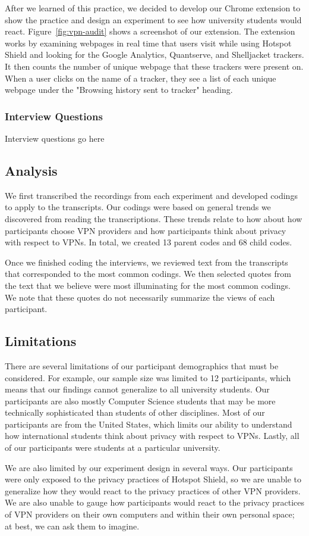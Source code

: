 After we learned of this practice, we decided to develop our Chrome extension to show the practice and design an experiment to see how university students would react.
Figure~\ref{fig:vpn-audit} shows a screenshot of our extension.
The extension works by examining webpages in real time that users visit while using Hotspot Shield and looking for the Google Analytics, Quantserve, and Shelljacket trackers.
It then counts the number of unique webpage that these trackers were present on.
When a user clicks on the name of a tracker, they see a list of each unique webpage under the "Browsing history sent to tracker" heading.

\subsubsection{Interview Questions}
Interview questions go here

\subsection{Analysis}
We first transcribed the recordings from each experiment and developed codings to apply to the transcripts.
Our codings were based on general trends we discovered from reading the transcriptions.
These trends relate to how about how participants choose VPN providers and how participants think about privacy with respect to VPNs.
In total, we created 13 parent codes and 68 child codes.

Once we finished coding the interviews, we reviewed text from the transcripts that corresponded to the most common codings.
We then selected quotes from the text that we believe were most illuminating for the most common codings.
We note that these quotes do not necessarily summarize the views of each participant.

\subsection{Limitations}
There are several limitations of our participant demographics that must be considered.
For example, our sample size was limited to 12 participants, which means that our findings cannot generalize to all university students.
Our participants are also mostly Computer Science students that may be more technically sophisticated than students of other disciplines.
Most of our participants are from the United States, which limits our ability to understand how international students think about privacy with respect to VPNs.
Lastly, all of our participants were students at a particular university.

We are also limited by our experiment design in several ways.
Our participants were only exposed to the privacy practices of Hotspot Shield, so we are unable to generalize how they would react to the privacy practices of other VPN providers.
We are also unable to gauge how participants would react to the privacy practices of VPN providers on their own computers and within their own personal space; at best, we can ask them to imagine.